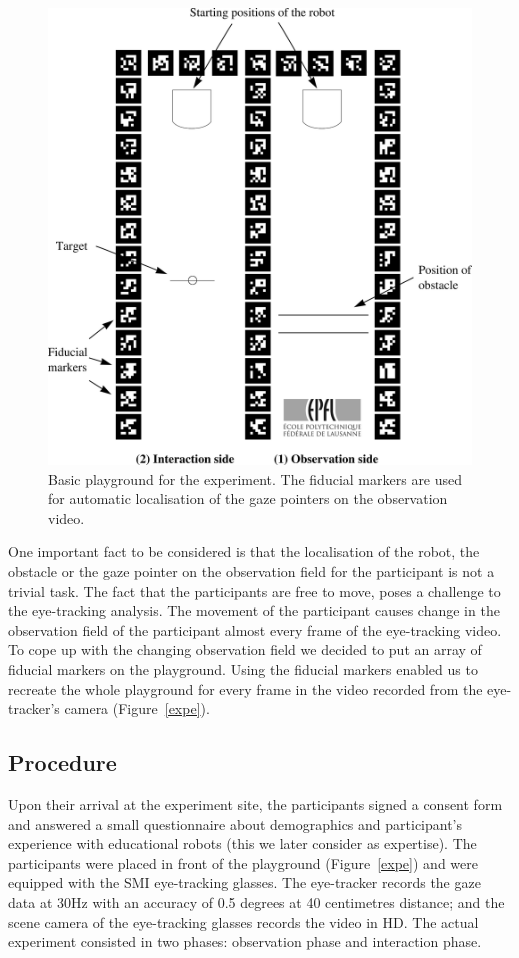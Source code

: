 \documentclass{sig-alternate}
\begin{document}
\begin{figure}
    \centering
    \includegraphics[width=0.9\linewidth]{maze}
    \caption{\small Basic playground for the experiment. The fiducial markers
    are used for automatic localisation of the gaze pointers on the observation
    video.}

    \label{playground}
\end{figure}

One important fact to be considered is that the localisation of the
robot, the obstacle or the gaze pointer on the observation field for the
participant is not a trivial task. The fact that the participants are
free to move, poses a challenge to the eye-tracking analysis. The
movement of the participant causes change in the observation field of
the participant almost every frame of the eye-tracking video. To cope up
with the changing observation field we decided to put an array of
fiducial markers on the playground. Using the fiducial markers enabled
us to recreate the whole playground for every frame in the video
recorded from the eye-tracker's camera (Figure~\ref{expe}).

\subsection{Procedure}

Upon their arrival at the experiment site, the participants signed a
consent form and answered a small questionnaire about demographics and
participant's experience with educational robots (this we later consider
as expertise). The participants were placed in front of the playground
(Figure~\ref{expe}) and were equipped with the SMI eye-tracking glasses. The eye-tracker records the gaze data at 30Hz with an accuracy of 0.5 degrees at 40 centimetres distance; and the scene camera of the eye-tracking glasses records the video in HD.  The
actual experiment consisted in two phases: observation phase and
interaction phase.
\end{document}
